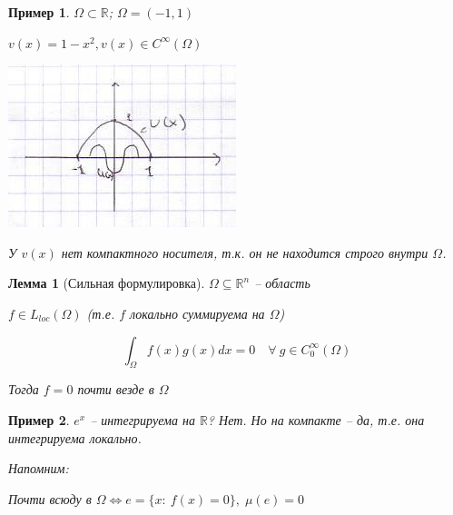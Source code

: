 \documentclass[12pt]{report}
\newtheorem{lemma}{Лемма}
\newtheorem{example}{Пример}
\begin{document}
\begin{example}
    $\Omega \subset \mathbb{R}$; $\Omega = (-1, 1)$
    
    $v(x) = 1 - x^2, v(x) \in C^\infty (\Omega)$
    
    \includegraphics{compfunc.jpg}
    
    У $v(x)$ нет компактного носителя, т.к. он не находится строго внутри $\Omega$.
\end{example}

\begin{lemma}[Сильная формулировка]
    $\Omega \subseteq \mathbb{R} ^ n$ -- область
    
    $f \in L_{loc}(\Omega)$ (т.е. $f$ локально суммируема на $\Omega$)
    
    $$\int_{\Omega}{f(x)g(x)dx} = 0 \quad \forall \: g \in C_0^\infty(\Omega)$$
    
    Тогда $f = 0$ почти везде в $\Omega$
\end{lemma}

\begin{example}
    $e^x$ -- интегрируема на $\mathbb{R}$? Нет. Но на компакте -- да, т.е. она интегрируема локально. 
    
    Напомним:
    
    Почти всюду в $\Omega \Longleftrightarrow e = \{x: \: f(x) = 0 \}, \; \mu(e) = 0$
\end{example}
\end{document}
